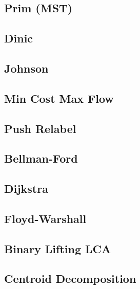 \subsection{Prim (MST)}
\raggedbottom
\hrulefill
\subsection{Dinic}
\raggedbottom
\hrulefill
\subsection{Johnson}
\raggedbottom
\hrulefill
\subsection{Min Cost Max Flow}
\raggedbottom
\hrulefill
\subsection{Push Relabel}
\raggedbottom
\hrulefill
\subsection{Bellman-Ford}
\raggedbottom
\hrulefill
\subsection{Dijkstra}
\raggedbottom
\hrulefill
\subsection{Floyd-Warshall}
\raggedbottom
\hrulefill
\subsection{Binary Lifting LCA}
\raggedbottom
\hrulefill
\subsection{Centroid Decomposition}
\raggedbottom
\hrulefill
